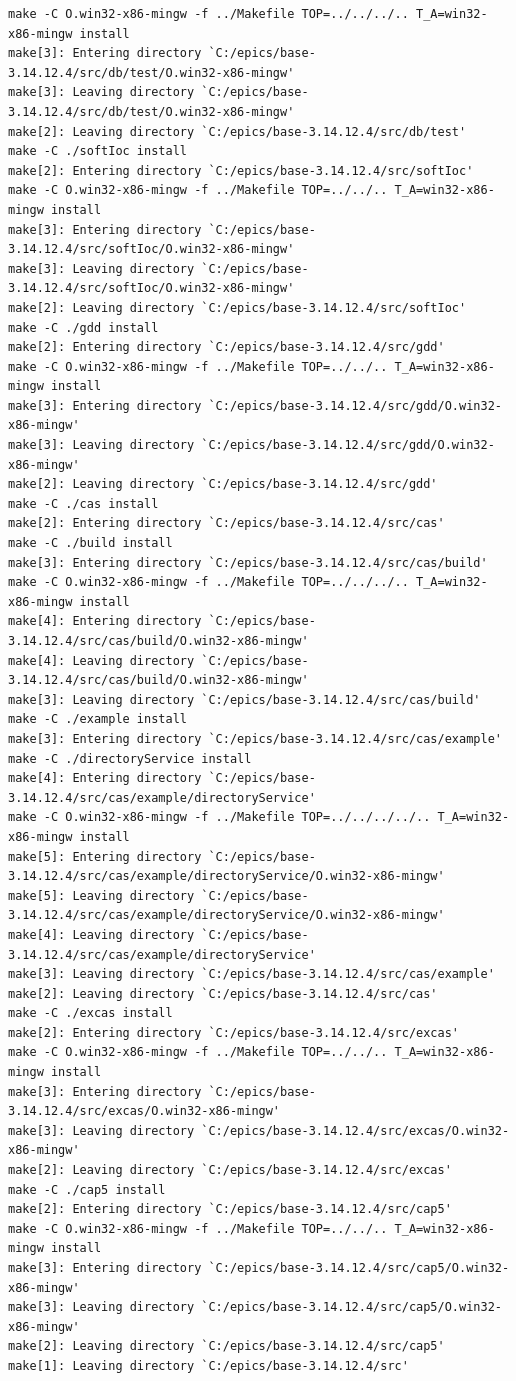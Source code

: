 \documentclass[11pt
  , a4paper
  , article
  , oneside
]{memoir}
\begin{document}
\begin{lstlisting}[style=termstyle]
make -C O.win32-x86-mingw -f ../Makefile TOP=../../../.. T_A=win32-x86-mingw install
make[3]: Entering directory `C:/epics/base-3.14.12.4/src/db/test/O.win32-x86-mingw'
make[3]: Leaving directory `C:/epics/base-3.14.12.4/src/db/test/O.win32-x86-mingw'
make[2]: Leaving directory `C:/epics/base-3.14.12.4/src/db/test'
make -C ./softIoc install
make[2]: Entering directory `C:/epics/base-3.14.12.4/src/softIoc'
make -C O.win32-x86-mingw -f ../Makefile TOP=../../.. T_A=win32-x86-mingw install
make[3]: Entering directory `C:/epics/base-3.14.12.4/src/softIoc/O.win32-x86-mingw'
make[3]: Leaving directory `C:/epics/base-3.14.12.4/src/softIoc/O.win32-x86-mingw'
make[2]: Leaving directory `C:/epics/base-3.14.12.4/src/softIoc'
make -C ./gdd install
make[2]: Entering directory `C:/epics/base-3.14.12.4/src/gdd'
make -C O.win32-x86-mingw -f ../Makefile TOP=../../.. T_A=win32-x86-mingw install
make[3]: Entering directory `C:/epics/base-3.14.12.4/src/gdd/O.win32-x86-mingw'
make[3]: Leaving directory `C:/epics/base-3.14.12.4/src/gdd/O.win32-x86-mingw'
make[2]: Leaving directory `C:/epics/base-3.14.12.4/src/gdd'
make -C ./cas install
make[2]: Entering directory `C:/epics/base-3.14.12.4/src/cas'
make -C ./build install
make[3]: Entering directory `C:/epics/base-3.14.12.4/src/cas/build'
make -C O.win32-x86-mingw -f ../Makefile TOP=../../../.. T_A=win32-x86-mingw install
make[4]: Entering directory `C:/epics/base-3.14.12.4/src/cas/build/O.win32-x86-mingw'
make[4]: Leaving directory `C:/epics/base-3.14.12.4/src/cas/build/O.win32-x86-mingw'
make[3]: Leaving directory `C:/epics/base-3.14.12.4/src/cas/build'
make -C ./example install
make[3]: Entering directory `C:/epics/base-3.14.12.4/src/cas/example'
make -C ./directoryService install
make[4]: Entering directory `C:/epics/base-3.14.12.4/src/cas/example/directoryService'
make -C O.win32-x86-mingw -f ../Makefile TOP=../../../../.. T_A=win32-x86-mingw install
make[5]: Entering directory `C:/epics/base-3.14.12.4/src/cas/example/directoryService/O.win32-x86-mingw'
make[5]: Leaving directory `C:/epics/base-3.14.12.4/src/cas/example/directoryService/O.win32-x86-mingw'
make[4]: Leaving directory `C:/epics/base-3.14.12.4/src/cas/example/directoryService'
make[3]: Leaving directory `C:/epics/base-3.14.12.4/src/cas/example'
make[2]: Leaving directory `C:/epics/base-3.14.12.4/src/cas'
make -C ./excas install
make[2]: Entering directory `C:/epics/base-3.14.12.4/src/excas'
make -C O.win32-x86-mingw -f ../Makefile TOP=../../.. T_A=win32-x86-mingw install
make[3]: Entering directory `C:/epics/base-3.14.12.4/src/excas/O.win32-x86-mingw'
make[3]: Leaving directory `C:/epics/base-3.14.12.4/src/excas/O.win32-x86-mingw'
make[2]: Leaving directory `C:/epics/base-3.14.12.4/src/excas'
make -C ./cap5 install
make[2]: Entering directory `C:/epics/base-3.14.12.4/src/cap5'
make -C O.win32-x86-mingw -f ../Makefile TOP=../../.. T_A=win32-x86-mingw install
make[3]: Entering directory `C:/epics/base-3.14.12.4/src/cap5/O.win32-x86-mingw'
make[3]: Leaving directory `C:/epics/base-3.14.12.4/src/cap5/O.win32-x86-mingw'
make[2]: Leaving directory `C:/epics/base-3.14.12.4/src/cap5'
make[1]: Leaving directory `C:/epics/base-3.14.12.4/src'
\end{lstlisting}
\end{document}
